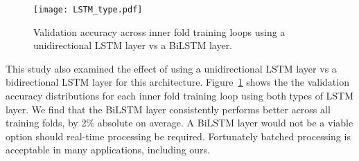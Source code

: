 \documentclass{article}
\begin{document}
\begin{figure}\begin{minipage}[b]{1.0\linewidth}
  \centering
  \centerline{\texttt{[image: LSTM\_type.pdf]}}
\end{minipage}
\vspace{-6mm}
\caption{Validation accuracy across inner fold training loops using a unidirectional LSTM layer vs a BiLSTM layer.}
\label{fig:lstm}
\vspace{-3mm}
\end{figure}

This study also examined the effect of using a unidirectional LSTM layer vs a bidirectional LSTM layer for this architecture.
\mbox{Figure \ref{fig:lstm}} shows the the validation accuracy distributions for each inner fold training loop using both types of LSTM layer.
We find that the BiLSTM layer consistently performs better across all training folds, by 2\% absolute on average.
A BiLSTM layer would not be a viable option should real-time processing be required.
Fortunately batched processing is acceptable in many applications, including ours.

\begin{table}
\caption{Comparison of best and compact outer fold VADs.}
    \label{tab:param_selection}
\end{table}
\end{document}
